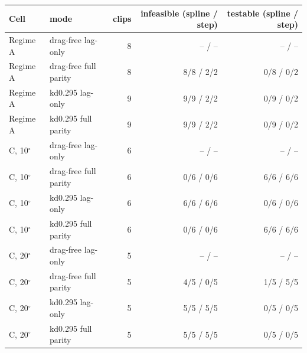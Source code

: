 \footnotesize
\begin{tabular}{llrrr}
\toprule
Cell & mode & clips & infeasible (spline / step) & testable (spline / step) \\
\midrule
Regime A & drag-free lag-only & 8 & -- / -- & -- / -- \\
Regime A & drag-free full parity & 8 & 8/8 / 2/2 & 0/8 / 0/2 \\
Regime A & kd0.295 lag-only & 9 & 9/9 / 2/2 & 0/9 / 0/2 \\
Regime A & kd0.295 full parity & 9 & 9/9 / 2/2 & 0/9 / 0/2 \\
C, 10$^\circ$ & drag-free lag-only & 6 & -- / -- & -- / -- \\
C, 10$^\circ$ & drag-free full parity & 6 & 0/6 / 0/6 & 6/6 / 6/6 \\
C, 10$^\circ$ & kd0.295 lag-only & 6 & 6/6 / 6/6 & 0/6 / 0/6 \\
C, 10$^\circ$ & kd0.295 full parity & 6 & 0/6 / 0/6 & 6/6 / 6/6 \\
C, 20$^\circ$ & drag-free lag-only & 5 & -- / -- & -- / -- \\
C, 20$^\circ$ & drag-free full parity & 5 & 4/5 / 0/5 & 1/5 / 5/5 \\
C, 20$^\circ$ & kd0.295 lag-only & 5 & 5/5 / 5/5 & 0/5 / 0/5 \\
C, 20$^\circ$ & kd0.295 full parity & 5 & 5/5 / 5/5 & 0/5 / 0/5 \\
\bottomrule
\end{tabular}
